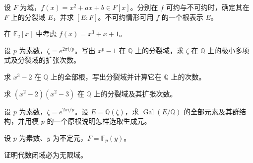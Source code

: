 \newpage
\noindent\begin{minipage}{\textwidth}
设 $F$ 为域，$f(x)=x^2+ax+b\in F[x]$。分别在 $f$ 可约与不可约时，确定其在 $F$ 上的分裂域 $E$，并求 $[E:F]$。不可约情形可用 $f$ 的一个根表示 $E$。
\end{minipage}\par\vfill
\noindent\begin{minipage}{\textwidth}
在 $\mathbb F_2[x]$ 中考虑 $f(x)=x^3+x+1$。
\end{minipage}\par\vfill
\noindent\begin{minipage}{\textwidth}
设 $p$ 为素数，$\zeta=e^{2\pi i/p}$。写出 $x^p-1$ 在 $\mathbb Q$ 上的分裂域，求 $\zeta$ 在 $\mathbb Q$ 上的极小多项式及分裂域的扩张次数。
\end{minipage}\par\vfill
\newpage
\noindent\begin{minipage}{\textwidth}
求 $x^3-2$ 在 $\mathbb Q$ 上的全部根，写出分裂域并计算它在 $\mathbb Q$ 上的次数。
\end{minipage}\par\vfill
\noindent\begin{minipage}{\textwidth}
求 $(x^2-2)(x^2-3)$ 在 $\mathbb Q$ 上的分裂域及其扩张次数。
\end{minipage}\par\vfill
\noindent\begin{minipage}{\textwidth}
设 $p$ 为素数，$\zeta=e^{2\pi i/p}$。设 $E=\mathbb Q(\zeta)$，求 $\operatorname{Gal}(E/\mathbb Q)$ 的全部元素及其群结构，并用模 $p$ 的一个原根说明怎样选取生成元。
\end{minipage}\par\vfill
\newpage
\noindent\begin{minipage}{\textwidth}
设 $p$ 为素数、$y$ 为不定元，$F=\mathbb F_p(y)$。
\end{minipage}\par\vfill
\noindent\begin{minipage}{\textwidth}
证明代数闭域必为无限域。
\end{minipage}\par\vfill
